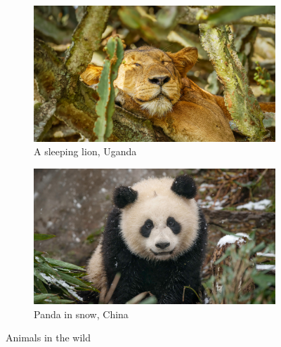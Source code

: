 \documentclass[a4paper]{article}
\begin{document}
    \begin{figure}
        \begin{subfigure}{0.45\linewidth}
            \includegraphics[width=\linewidth]{img/lion.jpg}
            \caption{A sleeping lion, Uganda} 
        \end{subfigure}
        \hfill 
        \begin{subfigure}{0.45\linewidth}  
            \includegraphics[width=\linewidth]{img/panda.jpg} 
            \caption{Panda in snow, China}  
        \end{subfigure}
        \caption{Animals in the wild} 
    \end{figure}
\end{document}
